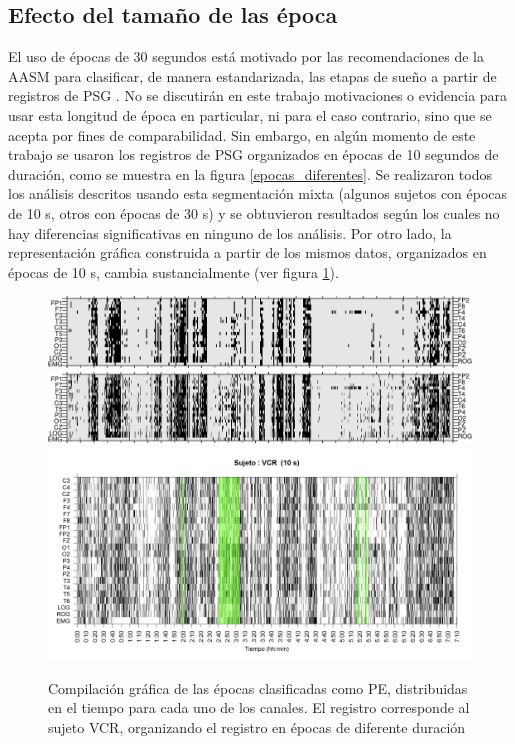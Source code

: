 
\subsection{Efecto del tamaño de las época}

El uso de épocas de 30 segundos está motivado por las recomendaciones de la AASM para 
clasificar, de manera estandarizada, las etapas de sueño a partir de registros de PSG 
\cite{AASM07}. 
No se discutirán en este trabajo motivaciones o evidencia para usar esta longitud de época en 
particular, ni para el caso contrario, sino que se acepta por fines de comparabilidad. 
Sin embargo, en algún momento de este trabajo se usaron los registros de PSG organizados en 
épocas de 10 segundos de duración, como se muestra en la figura \ref{epocas_diferentes}. 
Se realizaron todos los análisis descritos usando esta segmentación mixta (algunos sujetos con 
épocas de 10 s, otros con épocas de 30 s) y se obtuvieron resultados según los cuales no hay 
diferencias significativas en ninguno de los análisis. 
Por otro lado, la representación gráfica construida a partir de los mismos datos, organizados
en épocas de 10 s, cambia sustancialmente (ver figura \ref{comp_VCR}).

\begin{figure}
\centering
\includegraphics[width=0.9\linewidth] 
{./img_ejemplos/VCNNS1_est_60.png} 
\\
\includegraphics[width=0.9\linewidth]
{./img_ejemplos/VCNNS1_est_30.png} 
\\
\includegraphics[width=0.9\linewidth]
{./img_ejemplos/VCNNS1_est_10.png} 
\caption{Compilación gráfica de las épocas clasificadas como PE, distribuidas en el tiempo
para cada uno de los canales. El registro corresponde al sujeto VCR, organizando el registro en
épocas de diferente duración}
\label{comp_VCR}
\end{figure}

